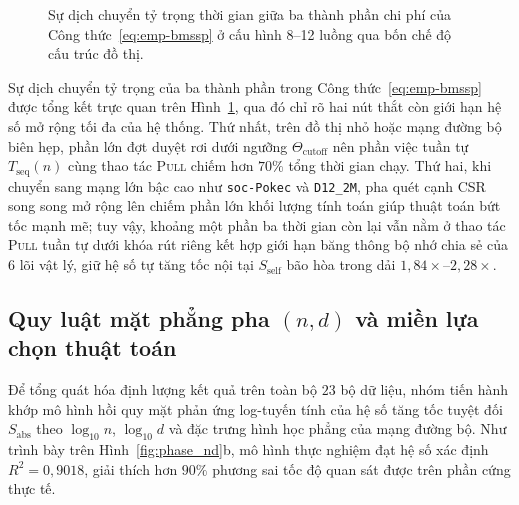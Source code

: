 \begin{figure}[!htb]
{%
}
\caption{Sự dịch chuyển tỷ trọng thời gian giữa ba thành phần chi phí của Công thức~\eqref{eq:emp-bmssp} ở cấu hình 8--12 luồng qua bốn chế độ cấu trúc đồ thị.}
\label{fig:tikz_arch_regime}
\end{figure}

Sự dịch chuyển tỷ trọng của ba thành phần trong Công thức~\eqref{eq:emp-bmssp} được tổng kết trực quan trên Hình~\ref{fig:tikz_arch_regime}, qua đó chỉ rõ hai nút thắt còn giới hạn hệ số mở rộng tối đa của hệ thống. Thứ nhất, trên đồ thị nhỏ hoặc mạng đường bộ biên hẹp, phần lớn đợt duyệt rơi dưới ngưỡng $\Theta_{\mathrm{cutoff}}$ nên phần việc tuần tự $T_{\mathrm{seq}}(n)$ cùng thao tác \textsc{Pull} chiếm hơn $70\%$ tổng thời gian chạy. Thứ hai, khi chuyển sang mạng lớn bậc cao như \texttt{soc-Pokec} và \texttt{D12\_2M}, pha quét cạnh CSR song song mở rộng lên chiếm phần lớn khối lượng tính toán giúp thuật toán bứt tốc mạnh mẽ; tuy vậy, khoảng một phần ba thời gian còn lại vẫn nằm ở thao tác \textsc{Pull} tuần tự dưới khóa rút riêng kết hợp giới hạn băng thông bộ nhớ chia sẻ của $6$ lõi vật lý, giữ hệ số tự tăng tốc nội tại $S_{\mathrm{self}}$ bão hòa trong dải $1{,}84\times$--$2{,}28\times$.

\subsection{Quy luật mặt phẳng pha $(n, d)$ và miền lựa chọn thuật toán}\label{subsec:c3-phase-law}

Để tổng quát hóa định lượng kết quả trên toàn bộ $23$ bộ dữ liệu, nhóm tiến hành khớp mô hình hồi quy mặt phản ứng log-tuyến tính của hệ số tăng tốc tuyệt đối $S_{\mathrm{abs}}$ theo $\log_{10} n$, $\log_{10} d$ và đặc trưng hình học phẳng của mạng đường bộ. Như trình bày trên Hình~\ref{fig:phase_nd}b, mô hình thực nghiệm đạt hệ số xác định $R^2 = 0{,}9018$, giải thích hơn $90\%$ phương sai tốc độ quan sát được trên phần cứng thực tế.

